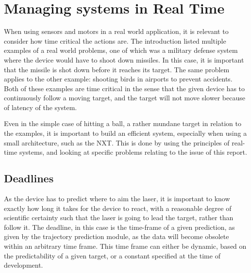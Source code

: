 
\section{Managing systems in Real Time}
\label{sec:rts-intro}
When using sensors and motors in a real world application, it is relevant to consider how time critical the actions are.
The introduction listed multiple examples of a real world problems, one of which was a military defense system where the device would have to shoot down missiles.
In this case, it is important that the missile is shot down before it reaches its target.
The same problem applies to the other example: shooting birds in airports to prevent accidents.
Both of these examples are time critical in the sense that the given device has to continuously follow a moving target, and the target will not move slower because of latency of the system.

Even in the simple case of hitting a ball, a rather mundane target in relation to the examples, it is important to build an efficient system, especially when using a small architecture, such as the NXT.
This is done by using the principles of real-time systems, and looking at specific problems relating to the issue of this report.

\subsection{Deadlines}
As the device has to predict where to aim the laser, it is important to know exactly how long it takes for the device to react, with a reasonable degree of scientific certainty such that the laser is going to lead the target, rather than follow it. 
The deadline, in this case is the time-frame of a given prediction, as given by the trajectory prediction module, as the data will become obsolete within an arbitrary time frame.
This time frame can either be dynamic, based on the predictability of a given target, or a constant specified at the time of development.

